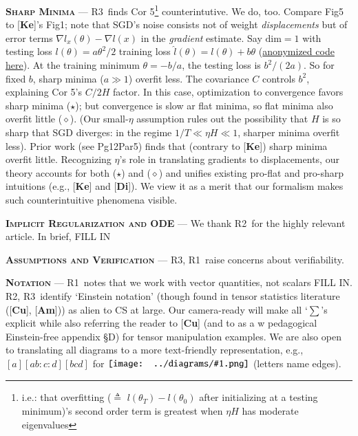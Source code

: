 \documentclass{article}
\newcommand{\Ra}{\textmd{\textsf{\color{purple!50} {R1}}}}
\newcommand{\Rb}{\textmd{\textsf{\color{green!60}  {R2}}}}
\newcommand{\Rc}{\textmd{\textsf{\color{blue!50}   {R3}}}}
\newcommand{\cor}[1]{\textmd{\textsf{Cor #1}}}
\newcommand{\pag}[1]{\textmd{{\color{gray}Pg}{#1}}}
\newcommand{\pgph}[1]{\textmd{{\color{gray}Par}{#1}}}
\newcommand{\fig}[1]{\textmd{{\color{gray}Fig}#1}}
\newcommand{\cit}[1]{[\textbf{#1}]}
\newcommand{\moosect}[1]{\par\textsc{\textbf{#1}} ---}
\newcommand{\offive}[1]{
    {\tiny
        \raisebox{-0.04cm}{\color{gray}\scalebox{2.5}{$\substack{
            \ifthenelse{\equal{#1}{0}}{{\color{moor}\blacksquare}}{\square} 
        }$}}%
        \raisebox{0.04cm}{$\substack{
            \IfSubStr{#1}{1}{{\color{moor}\blacksquare}}{\square}   
            \IfSubStr{#1}{1}{{\color{moor}\blacksquare}}{\square} \\
            \IfSubStr{#1}{2}{{\color{moor}\blacksquare}}{\square}    
            \IfSubStr{#1}{2}{{\color{moor}\blacksquare}}{\square}    
        }$}%
    }%
}
\newcommand{\sizeddia}[2]{%
    \begin{gathered}%
        \texttt{[image: ../diagrams/\#1.png]}%
    \end{gathered}%
}
\newcommand{\sdia}[1]{\protect \sizeddia{#1}{0.10}}
\begin{document}
\moosect{Sharp Minima}
    \Rc\ finds \cor{5}\footnote{i.e.: that overfitting
    ($\triangleq$ $l(\theta_T)-l(\theta_0)$ after initializing at a testing
    minimum)'s second order term is greatest
    when $\eta H$ has moderate eigenvalues}
    counterintutive.  We do, too.
    Compare \fig{5\offive{1}} to \cit{Ke}'s \fig{1}; note that SGD's noise
    consists not of weight \emph{displacements} but of
    error terms $\nabla l_x(\theta)-\nabla l(x)$ in the \emph{gradient}
    estimate.  
    Say $\text{dim}=1$ with testing loss $l(\theta)=a \theta^2/2$ training loss
    $\hat l(\theta)=l(\theta)+b\theta$
    (\href{https://gist.github.com/anonymous-taylor-series/60ee7ca824e44a9e8f25e69ceb60995e}{anonymized code here}).  At the training minimum $\theta=-b/a$, the testing loss is
    $b^2/(2a)$.  So for fixed $b$, sharp minima ($a\gg 1$) overfit less.  The
    covariance $C$ controls $b^2$, explaining
    \cor{5}'s $C/2H$ factor.  
    In this case, optimization to convergence favors sharp minima
    ($\star$); but convergence is slow ar flat minima, so 
    flat minima also overfit little ($\diamond$).  (Our
    small-$\eta$ assumption rules out the possibility that $H$ is so sharp that
    SGD diverges: in the regime $1/T \ll \eta H \ll 1$, sharper minima overfit
    less).
    Prior work (see \pag{12}\pgph{5}) finds that (contrary to \cit{Ke}) sharp
    minima overfit little.  Recognizing $\eta$'s role in translating
    gradients to displacements, our theory accounts for both ($\star$) and
    ($\diamond$) and unifies existing pro-flat and pro-sharp intuitions
    (e.g., \cit{Ke} and \cit{Di}).
    We view it as a merit that our formalism makes such counterintuitive
    phenomena visible.
    
\moosect{Implicit Regularization and ODE}
    We thank \Rb\ for the highly relevant article.  In brief,  
    {\color{moor} FILL IN}
    
\moosect{Assumptions and Verification} \Rc,\Ra\ raise concerns about verifiability.
        {\color{moor}{FILL IN}}

\moosect{Notation}
    \Ra\ notes that we work with vector quantities, not scalars {\color{moor}FILL IN}.
    \Rb,\Rc\ identify `Einstein notation' (though found in tensor
    statistics literature (\cit{Cu}, \cit{Am})) as alien to CS at large.  Our camera-ready
    will make all `$\sum$'s explicit while also referring the reader to
    \cit{Cu} (and to as a w pedagogical Einstein-free appendix \S{D}) for tensor manipulation examples.
    We are also open to translating all diagrams to a more text-friendly
    representation, e.g., $[a][ab:c:d][bcd]$ for $\sdia{MOOc(0-123-4)(01-14-34-24)}$
    (letters name edges).
\end{document}
